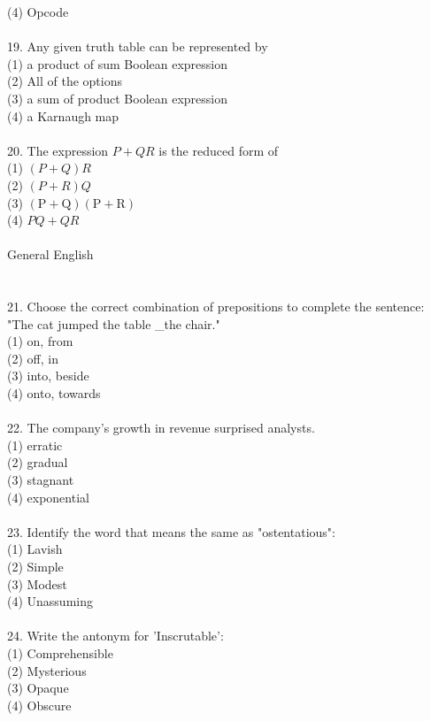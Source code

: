 \documentclass[10pt]{article}
\begin{document}
(4) Opcode\\
\\
19. Any given truth table can be represented by\\
(1) a product of sum Boolean expression\\
(2) All of the options\\
(3) a sum of product Boolean expression\\
(4) a Karnaugh map\\
\\
20. The expression $P+Q R$ is the reduced form of\\
(1) $(P+Q) R$\\
(2) $(P+R) Q$\\
(3) $(\mathrm{P}+\mathrm{Q})(\mathrm{P}+\mathrm{R})$\\
(4) $P Q+Q R$
\\
\\
General English\\
\\
\\
21. Choose the correct combination of prepositions to complete the sentence:\\
"The cat jumped the table \_the chair."\\
(1) on, from\\
(2) off, in\\
(3) into, beside\\
(4) onto, towards\\\\
22. The company's growth in revenue surprised analysts.\\
(1) erratic\\
(2) gradual\\
(3) stagnant\\
(4) exponential\\\\
23. Identify the word that means the same as "ostentatious":\\
(1) Lavish\\
(2) Simple\\
(3) Modest\\
(4) Unassuming\\\\
24. Write the antonym for 'Inscrutable':\\
(1) Comprehensible\\
(2) Mysterious\\
(3) Opaque\\
(4) Obscure\\\\
\end{document}
